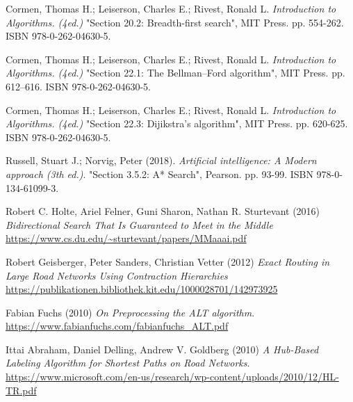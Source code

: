 \cleardoublepage
{}
{}
\begin{thebibliography}{99}
	
	
	Cormen, Thomas H.; Leiserson, Charles E.; Rivest, Ronald L. \emph{Introduction to Algorithms.  (4ed.)} "Section 20.2: Breadth-first search", MIT Press. pp. 554-262.
	ISBN 978-0-262-04630-5. 
	
	Cormen, Thomas H.; Leiserson, Charles E.; Rivest, Ronald L. \emph{Introduction to Algorithms.  (4ed.)} "Section 22.1: The Bellman–Ford algorithm", MIT Press. pp. 612–616.
	ISBN 978-0-262-04630-5.
	
	Cormen, Thomas H.; Leiserson, Charles E.; Rivest, Ronald L. \emph{Introduction to Algorithms.  (4ed.)} "Section 22.3: Dijikstra's algorithm", MIT Press. pp. 620-625.
	ISBN 978-0-262-04630-5.  
	
	Russell, Stuart J.; Norvig, Peter (2018). 
	\emph{Artificial intelligence: A Modern approach (3th ed.)}. "Section 3.5.2: A* Search", Pearson. pp. 93-99. ISBN 978-0-134-61099-3.
	
	Robert C. Holte, Ariel Felner, Guni Sharon, Nathan R. Sturtevant (2016)
	\emph{Bidirectional Search That Is Guaranteed to Meet in the Middle}
	\url{https://www.cs.du.edu/~sturtevant/papers/MMaaai.pdf}
	
	Robert Geisberger, Peter Sanders, Christian Vetter (2012)
	\emph{Exact Routing in Large Road Networks Using Contraction Hierarchies}
	\url{https://publikationen.bibliothek.kit.edu/1000028701/142973925}
	
	Fabian Fuchs (2010)
	\emph{On Preprocessing the ALT algorithm}.
	\url{https://www.fabianfuchs.com/fabianfuchs_ALT.pdf}
	
	Ittai Abraham, Daniel Delling, Andrew V. Goldberg (2010)
	\emph{A Hub-Based Labeling Algorithm for Shortest Paths on Road Networks}.
	\url{https://www.microsoft.com/en-us/research/wp-content/uploads/2010/12/HL-TR.pdf}
	
	
\end{thebibliography}
